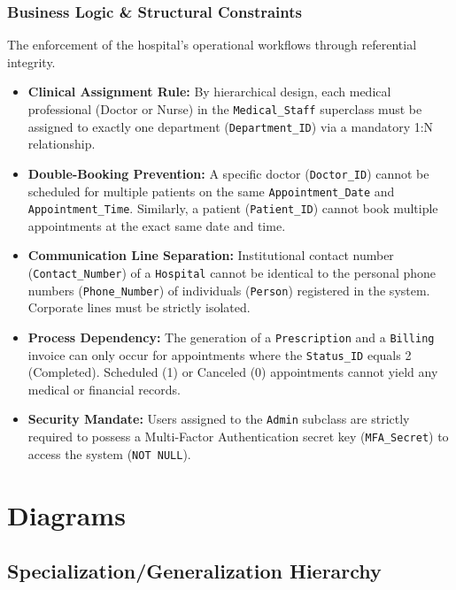\documentclass[12pt,a4paper]{article}
\begin{document}
\subsubsection*{Business Logic \& Structural Constraints}
The enforcement of the hospital's operational workflows through referential integrity.
\begin{itemize}[label=\textbf{--}]
	\item \textbf{Clinical Assignment Rule:} By hierarchical design, each medical professional (Doctor or Nurse) in the \texttt{Medical\_Staff} superclass must be assigned to exactly one department (\texttt{Department\_ID}) via a mandatory 1:N relationship.
	\item \textbf{Double-Booking Prevention:} A specific doctor (\texttt{Doctor\_ID}) cannot be scheduled for multiple patients on the same \texttt{Appointment\_Date} and \texttt{Appointment\_Time}. Similarly, a patient (\texttt{Patient\_ID}) cannot book multiple appointments at the exact same date and time.
	\item \textbf{Communication Line Separation:} Institutional contact number (\texttt{Contact\_Number}) of a \texttt{Hospital} cannot be identical to the personal phone numbers (\texttt{Phone\_Number}) of individuals (\texttt{Person}) registered in the system. Corporate lines must be strictly isolated.
	\item \textbf{Process Dependency:} The generation of a \texttt{Prescription} and a \texttt{Billing} invoice can only occur for appointments where the \texttt{Status\_ID} equals 2 (Completed). Scheduled (1) or Canceled (0) appointments cannot yield any medical or financial records.
	\item \textbf{Security Mandate:} Users assigned to the \texttt{Admin} subclass are strictly required to possess a Multi-Factor Authentication secret key (\texttt{MFA\_Secret}) to access the system (\texttt{NOT NULL}).
\end{itemize}



\section{Diagrams}
\label{sec:diagrams}

\vspace{0.5cm}
\subsection{Specialization/Generalization Hierarchy}
\end{document}
